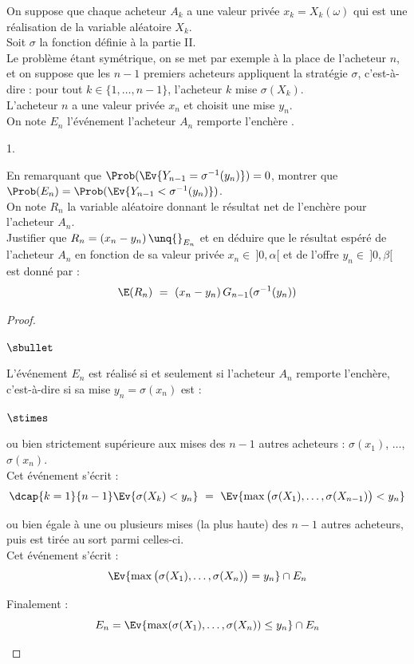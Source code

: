 \documentclass[11pt]{article}%
\begin{document}
\noindent
On suppose que chaque acheteur $A_k$ a une valeur privée $x_k = 
X_k(\omega)$ qui est une réalisation de la variable aléatoire $X_k$.\\
Soit $\sigma$ la fonction définie à la partie II.\\
Le problème étant symétrique, on se met par exemple à la place de 
l'acheteur $n$, et on suppose que les $n-1$ premiers acheteurs 
appliquent la stratégie $\sigma$, c'est-à-dire : pour tout $k\in \{1, 
\ldots, n-1\}$, l'acheteur $k$ mise $\sigma(X_k)$.\\
L'acheteur $n$ a une valeur privée $x_n$ et choisit une mise $y_n$.\\
On note $E_n$ l'événement \og l'acheteur $A_n$ remporte l'enchère \fg{}.
\begin{noliste}{1.}
  \setlength{\itemsep}{4mm}
  \setcounter{enumi}{9}
  \item En remarquant que $\Prob(\Ev{Y_{n-1} = \sigma^{-1}(y_n)}) = 0$,
  montrer que $\Prob(E_n) = \Prob(\Ev{Y_{n-1} < \sigma^{-1}(y_n)})$.\\
  On note $R_n$ la variable aléatoire donnant le résultat net de 
  l'enchère pour l'acheteur $A_n$.\\
  Justifier que $R_n = (x_n-y_n) \, \unq{}_{E_n}$ et en déduire que le 
  résultat espéré de l'acheteur $A_n$ en fonction de sa valeur 
  privée $x_n \in \ ]0,\alpha[$ et de l'offre $y_n \in \ ]0,\beta[$ 
  est donné par :
  \[
    \E(R_n) \ = \ (x_n-y_n) \, G_{n-1}(\sigma^{-1}(y_n))
  \]
  
  
  
  
  \begin{proof}~
    \begin{noliste}{$\sbullet$}
      \item L'événement $E_n$ est réalisé si et seulement si 
      l'acheteur $A_n$ remporte l'enchère, c'est-à-dire si sa mise 
      $y_n = \sigma(x_n)$ est :
      \begin{noliste}{$\stimes$}
	\item ou bien strictement supérieure aux mises des 
	$n-1$ autres acheteurs : $\sigma(x_1)$, $\ldots$, 
	$\sigma(x_n)$.\\
	Cet événement s'écrit :
	\[
	  \dcap{k=1}{n-1} \Ev{\sigma(X_k) < y_n}
	  \ = \ \Ev{\max\big( \sigma(X_1), \ldots, \sigma(X_{n-1})\big)
	  < y_n}
	\]
	
	
	\item ou bien égale à une ou plusieurs mises (la plus haute) 
	des $n-1$ 
	autres acheteurs, puis est tirée au sort parmi celles-ci.\\
	Cet événement s'écrit :
	\[
	  \Ev{\max\big( \sigma(X_1), \ldots, \sigma(X_n)\big)
	  = y_n} \cap E_n
	\]
      \end{noliste}
      Finalement :
      \[
        E_n = \Ev{\max(\sigma(X_1) , \ldots, \sigma(X_n)) \leq 
        y_n} \cap E_n
      \]
      

\end{noliste}
\end{proof}
\end{noliste}
\end{document}
